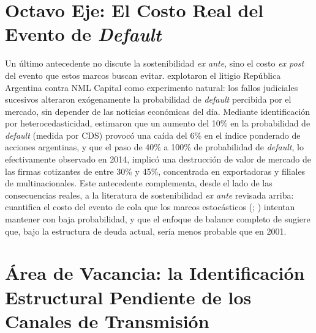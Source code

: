 \section{Octavo Eje: El Costo Real del Evento de \textit{Default}}

Un último antecedente no discute la sostenibilidad \textit{ex ante}, sino el costo \textit{ex post} del evento que estos marcos buscan evitar. \citet{hebert2017} explotaron el litigio República Argentina contra NML Capital como experimento natural: los fallos judiciales sucesivos alteraron exógenamente la probabilidad de \textit{default} percibida por el mercado, sin depender de las noticias económicas del día. Mediante identificación por heterocedasticidad, estimaron que un aumento del 10\% en la probabilidad de \textit{default} (medida por CDS) provocó una caída del 6\% en el índice ponderado de acciones argentinas, y que el paso de 40\% a 100\% de probabilidad de \textit{default}, lo efectivamente observado en 2014, implicó una destrucción de valor de mercado de las firmas cotizantes de entre 30\% y 45\%, concentrada en exportadoras y filiales de multinacionales. Este antecedente complementa, desde el lado de las consecuencias reales, a la literatura de sostenibilidad \textit{ex ante} revisada arriba: cuantifica el costo del evento de cola que los marcos estocásticos (\citealp{medeiros2012}; \citealp{imf2024}) intentan mantener con baja probabilidad, y que el enfoque de balance completo de \citet{levyyeyati2021} sugiere que, bajo la estructura de deuda actual, sería menos probable que en 2001.

\section[Área de Vacancia: la Identificación Estructural Pendiente de los Canales de Transmisión]{Área de Vacancia: la Identificación Estructural Pendiente de los Canales de Transmisión}
\label{sec:vacancia}

